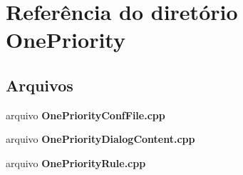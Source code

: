 \section{Referência do diretório One\+Priority}
\label{dir_42d550ef3badf5a97ed37a00d9b45f25}
\subsection*{Arquivos}
\begin{DoxyCompactItemize}
\item 
arquivo {\bf One\+Priority\+Conf\+File.\+cpp}
\item 
arquivo {\bf One\+Priority\+Dialog\+Content.\+cpp}
\item 
arquivo {\bf One\+Priority\+Rule.\+cpp}
\end{DoxyCompactItemize}
